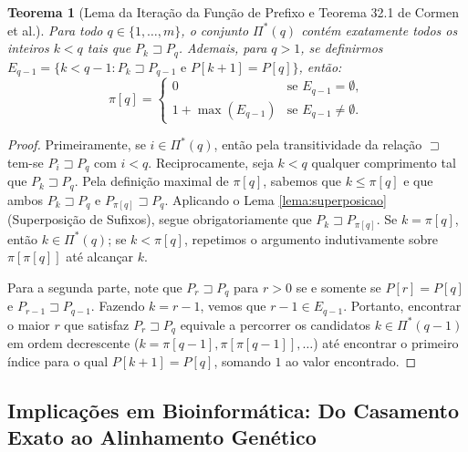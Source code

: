 \documentclass[12pt,a4paper]{article}
\newtheorem{teorema}{Teorema}[section]
\begin{document}
\begin{teorema}[Lema da Iteração da Função de Prefixo e Teorema 32.1 de Cormen et al.]
\label{teo:kmp_prefixo}
Para todo $q \in \{1, \dots, m\}$, o conjunto $\Pi^*(q)$ cont\'em exatamente todos os inteiros $k < q$ tais que $P_k \sqsupset P_q$. Ademais, para $q > 1$, se definirmos $E_{q-1} = \{k < q-1 : P_k \sqsupset P_{q-1} \text{ e } P[k+1] = P[q]\}$, ent\~ao:
\begin{equation}
    \pi[q] = \begin{cases}
        0 & \text{se } E_{q-1} = \emptyset, \\
        1 + \max(E_{q-1}) & \text{se } E_{q-1} \neq \emptyset.
    \end{cases}
\end{equation}
\end{teorema}
\begin{proof}
Primeiramente, se $i \in \Pi^*(q)$, ent\~ao pela transitividade da rela\c{c}\~ao $\sqsupset$ tem-se $P_i \sqsupset P_q$ com $i < q$. Reciprocamente, seja $k < q$ qualquer comprimento tal que $P_k \sqsupset P_q$. Pela defini\c{c}\~ao maximal de $\pi[q]$, sabemos que $k \le \pi[q]$ e que ambos $P_k \sqsupset P_q$ e $P_{\pi[q]} \sqsupset P_q$. Aplicando o Lema \ref{lema:superposicao} (Superposi\c{c}\~ao de Sufixos), segue obrigatoriamente que $P_k \sqsupset P_{\pi[q]}$. Se $k = \pi[q]$, ent\~ao $k \in \Pi^*(q)$; se $k < \pi[q]$, repetimos o argumento indutivamente sobre $\pi[\pi[q]]$ at\'e alcan\c{c}ar $k$.

Para a segunda parte, note que $P_r \sqsupset P_q$ para $r > 0$ se e somente se $P[r] = P[q]$ e $P_{r-1} \sqsupset P_{q-1}$. Fazendo $k = r - 1$, vemos que $r - 1 \in E_{q-1}$. Portanto, encontrar o maior $r$ que satisfaz $P_r \sqsupset P_q$ equivale a percorrer os candidatos $k \in \Pi^*(q-1)$ em ordem decrescente ($k = \pi[q-1], \pi[\pi[q-1]], \dots$) at\'e encontrar o primeiro \'indice para o qual $P[k+1] = P[q]$, somando $1$ ao valor encontrado.
\end{proof}

\subsection{Implica\c{c}\~oes em Bioinform\'atica: Do Casamento Exato ao Alinhamento Gen\'etico}
\end{document}

